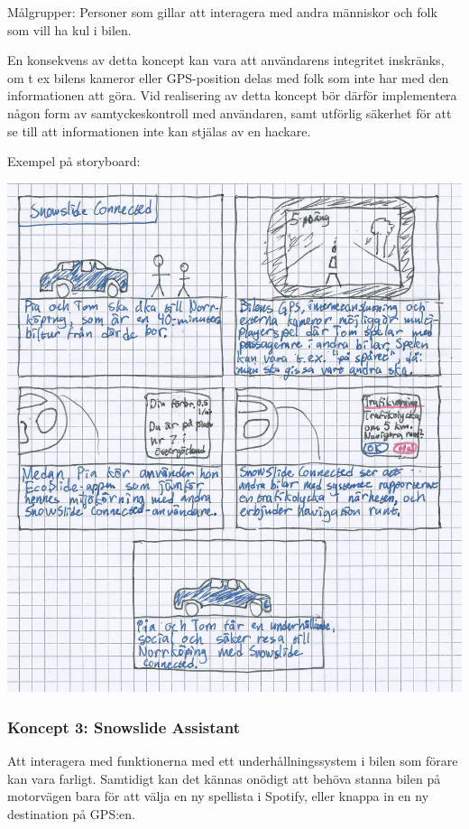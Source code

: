\documentclass[a4paper,12pt,titlepage]{article}
\begin{document}
Målgrupper: Personer som gillar att interagera med andra människor och folk som
vill ha kul i bilen.

En konsekvens av detta koncept kan vara att användarens integritet inskränks,
om t ex bilens kameror eller GPS-position delas med folk som inte har med den
informationen att göra. Vid realisering av detta koncept bör därför
implementera någon form av samtyckeskontroll med användaren, samt utförlig
säkerhet för att se till att informationen inte kan stjälas av en hackare.

\newpage
Exempel på storyboard:

\begin{center}
\includegraphics[width=15cm]{images/connected.jpg}
\end{center}

\newpage
\subsubsection*{Koncept 3: Snowslide Assistant}

Att interagera med funktionerna med ett underhållningssystem i bilen som förare
kan vara farligt. Samtidigt kan det kännas onödigt att behöva stanna bilen på
motorvägen bara för att välja en ny spellista i Spotify, eller knappa in en ny
destination på GPS:en.
\end{document}
